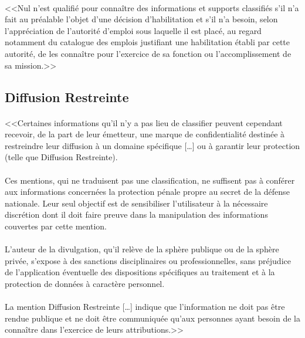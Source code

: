 \documentclass[11pt, book, english, french, standardlists]{upmethodology-document}
\begin{document}
				\paragraph*{}
					<<Nul n'est qualifié pour connaître des informations et supports classifiés s'il n'a fait au préalable l'objet d'une décision d'habilitation et s'il n'a besoin, selon l'appréciation de l'autorité d'emploi sous laquelle il est placé, au regard notamment du catalogue des emplois justifiant une habilitation établi par cette autorité, de les connaître pour l'exercice de sa fonction ou l'accomplissement de sa mission.>>\cite{CodeDefenseR2311-7}
			\subsection{Diffusion Restreinte}
				\paragraph*{}
					<<Certaines informations qu'il n'y a pas lieu de classifier peuvent cependant recevoir, de la part de leur émetteur, une marque de confidentialité destinée à restreindre leur diffusion à un domaine spécifique [\ldots] ou à garantir leur protection (telle que Diffusion Restreinte).
				\paragraph*{}
					Ces mentions, qui ne traduisent pas une classification, ne suffisent pas à conférer aux informations concernées la protection pénale propre au secret de la défense nationale. Leur seul objectif est de sensibiliser l'utilisateur à la nécessaire discrétion dont il doit faire preuve dans la manipulation des informations couvertes par cette mention.
				\paragraph*{}
					L'auteur de la divulgation, qu'il relève de la sphère publique ou de la sphère privée, s'expose à des sanctions disciplinaires ou professionnelles, sans préjudice de l'application éventuelle des dispositions spécifiques au traitement et à la protection de données à caractère personnel.
				\paragraph*{}
					La mention Diffusion Restreinte [\ldots] indique que l'information ne doit pas être rendue publique et ne doit être communiquée qu'aux personnes ayant besoin de la connaître dans l'exercice de leurs attributions.>>\cite{PRMD1132480A}
\end{document}
